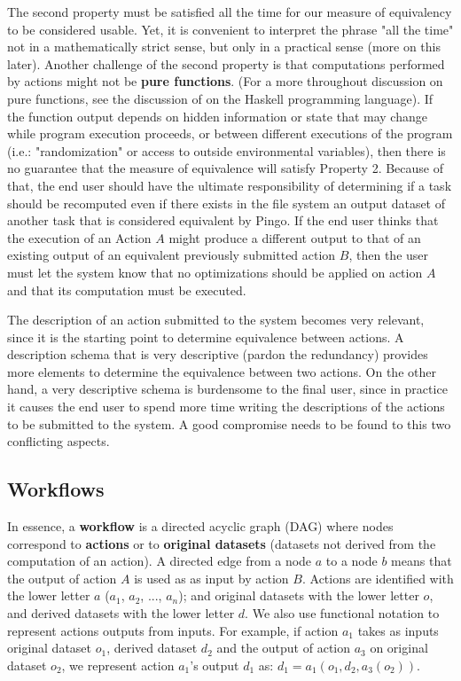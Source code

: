 The second property must be satisfied all the time for our measure of equivalency to be considered usable. Yet, it is convenient to interpret the phrase "all the time" not in a mathematically strict sense, but only in a practical sense (more on this later).  Another challenge of the second property is that computations performed by actions might not be \textbf{pure functions}. (For a more throughout discussion on pure functions, see the discussion of \cite{jones2003haskell} on the Haskell programming language). If the function output depends on hidden information or state that may change while program execution proceeds, or between different executions of the program (i.e.: "randomization" or access to outside environmental variables), then there is no guarantee that the measure of equivalence will satisfy Property 2.  Because of that, the end user should have the ultimate responsibility of determining if a task should be recomputed even if there exists in the file system an output dataset of another task that is considered equivalent by Pingo.  If the end user thinks that the execution of an Action $A$  might produce a different output to that of an existing output of an equivalent previously submitted action $B$, then the user must let the system know that no optimizations should be applied on action $A$ and that its computation must be executed.

The description of an action submitted to the system becomes very relevant, since it is the starting point to determine equivalence between actions. A description schema that is very descriptive (pardon the redundancy) provides more elements to determine the equivalence between two actions.  On the other hand, a very descriptive schema is burdensome to the final user, since in practice it causes the end user to spend more time writing the descriptions of the actions to be submitted to the system.  A good compromise needs to be found to this two conflicting aspects.

\subsection{Workflows}
In essence, a \textbf{workflow} is a directed acyclic graph (DAG) where nodes correspond to \textbf{actions} or to \textbf{original datasets} (datasets not derived from the computation of an action). A directed edge from a node $a$ to a node $b$ means that the output of action $A$ is used as as input by action $B$.  Actions are identified with the lower letter $a$ ($a_1$, $a_2$, ..., $a_n$); and original datasets with the lower letter $o$, and derived datasets with the lower letter $d$.  We also use functional notation to represent actions outputs from inputs.  For example, if action $a_1$ takes as inputs original dataset $o_1$, derived dataset $d_2$ and the output of action $a_3$ on original dataset $o_2$, we represent action $a_1$'s output $d_1$ as: $d_1 = a_1(o_1, d_2, a_3(o_2))$.

